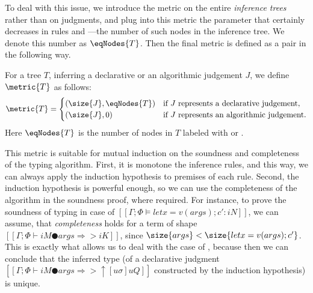 To deal with this issue, we introduce the metric on the entire \emph{inference
trees} rather than on judgments, and plug into this metric the parameter that
certainly decreases in rules  and
---the number of such nodes in the inference
tree. We denote this number as $\eqNodes{T}$. Then the final metric is defined
as a pair in the following way.

\begin{definition*}
    For a tree $T$, inferring a declarative or an algorithmic judgement $J$, we define $\metric{T}$ as follows:
        \[
        \metric{T} = \begin{cases}
        (\size{J}, \eqNodes{T}) & \text{if } J \text{ represents a declarative judgement}, \\
        (\size{J}, 0) & \text{if } J \text{ represents an algorithmic judgement}.
        \end{cases}
        \]
    Here $\eqNodes{T}$ is the number of nodes in $T$ labeled with  or .
\end{definition*}

This metric is suitable for mutual induction on the soundness and completeness
of the typing algorithm.  First, it is monotone \wrt the inference rules,
and this way, we can always apply the induction hypothesis to premises 
of each rule. Second, the induction hypothesis is powerful enough,
so we can use the completeness of the algorithm in the soundness proof,
where required. For instance, to prove the soundness
of typing in case of $[[Γ; Φ ⊨ let x = v(args); c' : iN]]$,
we can assume, that  \emph{completeness}
holds for a term of shape $[[Γ; Φ ⊢ iM ● args ⇒> iK ]]$, since
$\size{args} < \size{let x = v(args); c'}$.
This is exactly what allows us to 
deal with the case of ,
because then we can conclude that 
the inferred type (of a declarative judgment $[[Γ; Φ ⊢ iM ● args ⇒> ↑[uσ]uQ
]]$ constructed by the induction hypothesis) is unique.

